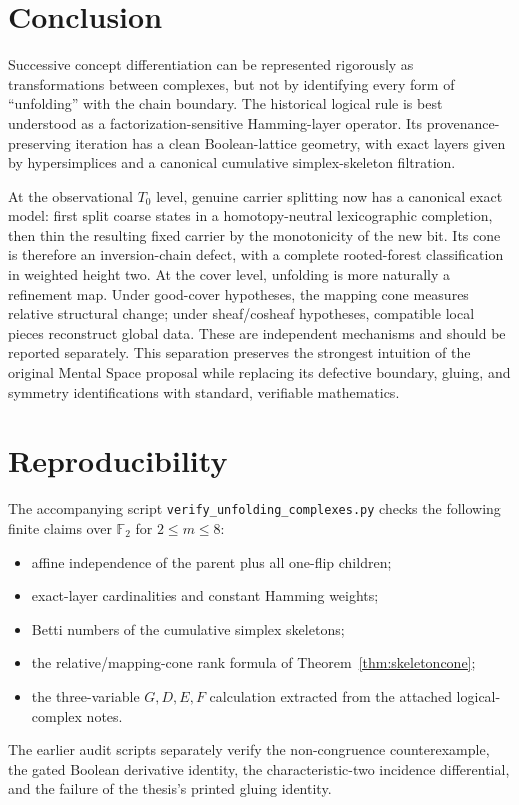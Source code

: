 \documentclass[11pt]{article}
\newcommand{\Ftwo}{\mathbb F_2}
\begin{document}
\section{Conclusion}

Successive concept differentiation can be represented rigorously as transformations between complexes, but not by identifying every form of ``unfolding'' with the chain boundary.  The historical logical rule is best understood as a factorization-sensitive Hamming-layer operator.  Its provenance-preserving iteration has a clean Boolean-lattice geometry, with exact layers given by hypersimplices and a canonical cumulative simplex-skeleton filtration.

At the observational $T_0$ level, genuine carrier splitting now has a canonical exact model: first split coarse states in a homotopy-neutral lexicographic completion, then thin the resulting fixed carrier by the monotonicity of the new bit.  Its cone is therefore an inversion-chain defect, with a complete rooted-forest classification in weighted height two.  At the cover level, unfolding is more naturally a refinement map.  Under good-cover hypotheses, the mapping cone measures relative structural change; under sheaf/cosheaf hypotheses, compatible local pieces reconstruct global data.  These are independent mechanisms and should be reported separately.  This separation preserves the strongest intuition of the original Mental Space proposal while replacing its defective boundary, gluing, and symmetry identifications with standard, verifiable mathematics.

\appendix
\section{Reproducibility}
The accompanying script \texttt{verify\_unfolding\_complexes.py} checks the following finite claims over $\Ftwo$ for $2\le m\le8$:
\begin{itemize}
\item affine independence of the parent plus all one-flip children;
\item exact-layer cardinalities and constant Hamming weights;
\item Betti numbers of the cumulative simplex skeletons;
\item the relative/mapping-cone rank formula of Theorem~\ref{thm:skeletoncone};
\item the three-variable $G,D,E,F$ calculation extracted from the attached logical-complex notes.
\end{itemize}
The earlier audit scripts separately verify the non-congruence counterexample, the gated Boolean derivative identity, the characteristic-two incidence differential, and the failure of the thesis's printed gluing identity.
\end{document}

